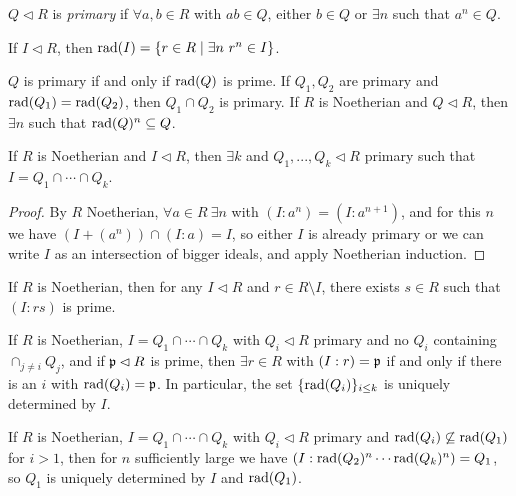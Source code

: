 \begin{defn} $Q \lhd R$ is \emph{primary} if $\forall a,b\in R$ with $ab \in Q$, either $b \in Q$ or $\exists n$ such that $a^n \in Q$.
\end{defn}

\begin{defn} If $I \lhd R$, then $\operatorname{rad}(I) = \{r \in R \mid \exists n\ r^n \in I\}$.
\end{defn}

\begin{prop} $Q$ is primary if and only if $\operatorname{rad}(Q)$ is prime. If $Q_1, Q_2$ are primary and $\operatorname{rad}(Q_1) = \operatorname{rad}(Q_2)$, then $Q_1 \cap Q_2$ is primary. If $R$ is Noetherian and $Q \lhd R$, then $\exists n$ such that $\operatorname{rad}(Q)^n \subseteq Q$.
\end{prop}

\begin{thm} If $R$ is Noetherian and $I \lhd R$, then $\exists k$ and $Q_1, ..., Q_k \lhd R$ primary such that $I = Q_1 \cap \cdots \cap Q_k$.
\end{thm}
\begin{proof} By $R$ Noetherian, $\forall a\in R\ \exists n$ with $(I:a^n) = (I:a^{n+1})$, and for this $n$ we have $(I+(a^n))\cap (I:a) = I$, so either $I$ is already primary or we can write $I$ as an intersection of bigger ideals, and apply Noetherian induction.
\end{proof}

\begin{lem} If $R$ is Noetherian, then for any $I \lhd R$ and $r \in R \setminus I$, there exists $s \in R$ such that $(I:rs)$ is prime.
\end{lem}

\begin{thm} If $R$ is Noetherian, $I = Q_1 \cap \cdots \cap Q_k$ with $Q_i \lhd R$ primary and no $Q_i$ containing $\cap_{j \ne i} Q_j$, and if $\mathfrak{p} \lhd R$ is prime, then $\exists r \in R$ with $(I:r) = \mathfrak{p}$ if and only if there is an $i$ with $\operatorname{rad}(Q_i) = \mathfrak{p}$. In particular, the set $\{\operatorname{rad}(Q_i)\}_{i \le k}$ is uniquely determined by $I$.
\end{thm}

\begin{thm} If $R$ is Noetherian, $I = Q_1 \cap \cdots \cap Q_k$ with $Q_i \lhd R$ primary and $\operatorname{rad}(Q_i) \not\subseteq \operatorname{rad}(Q_1)$ for $i > 1$, then for $n$ sufficiently large we have $(I:\operatorname{rad}(Q_2)^n \cdots \operatorname{rad}(Q_k)^n) = Q_1$, so $Q_1$ is uniquely determined by $I$ and $\operatorname{rad}(Q_1)$.
\end{thm}


